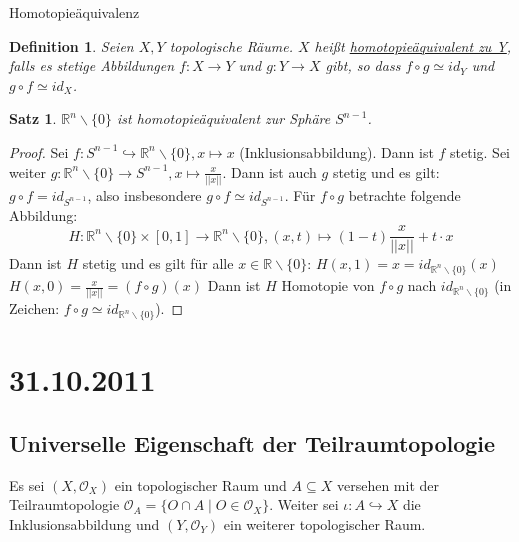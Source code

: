 \documentclass[a4paper,11pt,notitlepage]{report}
\newtheorem{definition}{Definition}[chapter]
\newtheorem{theorem}{Satz}[chapter]
\newcommand{\R}{{\ensuremath{\mathbb{R}}}}
\newcommand{\OO}{{\ensuremath{\mathcal{O}}}}
\begin{document}
\begin{section}{Homotopieäquivalenz}
	\begin{definition}
		Seien $X,Y$ topologische Räume. $X$ heißt \underline{homotopieäquivalent zu Y}, falls es stetige Abbildungen $f \colon X \rightarrow Y$ und $g \colon Y \rightarrow X$ gibt, so dass $f \circ g \simeq id_Y$ und $g \circ f \simeq id_X$.
	\end{definition}
	
	\begin{theorem}
		$\R^n \backslash \{0\}$ ist homotopieäquivalent zur Sphäre $S^{n-1}$.
	\end{theorem}
	
	\begin{proof}
		Sei $f \colon S^{n-1} \hookrightarrow \R^n \backslash \{0\}, x \mapsto x$ (Inklusionsabbildung). Dann ist $f$ stetig.
		\newline
		Sei weiter $g \colon \R^n \backslash \{0\} \rightarrow S^{n-1}, x \mapsto \frac{x}{||x||}$. Dann ist auch $g$ stetig und es gilt:
		$g \circ f = id_{S^{n-1}}$, also insbesondere $g \circ f \simeq id_{S^{n-1}}$.
		\newline
		Für $f \circ g$ betrachte folgende Abbildung:
		$$H \colon \R^n \backslash \{0\} \times [0,1] \rightarrow \R^n \backslash \{0\}, (x,t) \mapsto (1-t) \frac{x}{||x||} + t \cdot x$$
		Dann ist $H$ stetig und es gilt für alle $x \in \R \backslash \{0\}$:
		\newline
		$H(x,1) = x = id_{\R^n \backslash \{0\}}(x)$
		\newline
		$H(x,0) = \frac{x}{||x||} = (f \circ g)(x)$
		\newline
		Dann ist $H$ Homotopie von $f \circ g$ nach $id_{\R^n \backslash \{0\}}$ (in Zeichen: $f \circ g \simeq id_{\R^n \backslash \{0\}}$).
	\end{proof}
\end{section}

\chapter{31.10.2011}
\section{Universelle Eigenschaft der Teilraumtopologie}
Es sei $(X, \OO_X)$ ein topologischer Raum und $A \subseteq X$ versehen mit der Teilraumtopologie $\OO_A = \{ O \cap A \mid O \in \OO_X \}$. 
Weiter sei $\iota \colon A \hookrightarrow X$ die Inklusionsabbildung und $(Y, \OO_Y)$ ein weiterer topologischer Raum.
\end{document}
